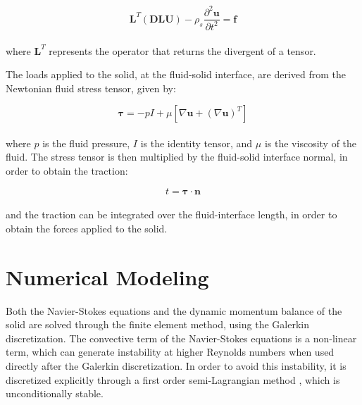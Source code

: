\documentclass{article}
\begin{document}
\begin{equation}
	\mathbf{L}^T ( \mathbf{D} \mathbf{L} \mathbf{U} ) - \rho_s \frac{\partial ^2 \mathbf{u} }{\partial t ^2 } = \mathbf{f}
	\label{eq:matrix form solid}
\end{equation} \\

\noindent where $\mathbf{L}^T$ represents the operator that returns the divergent of a tensor.
%
%

The loads applied to the solid, at the fluid-solid interface, are derived from the Newtonian fluid stress tensor, given by:

\begin{equation}
    \mathbf {\tau} = -pI + \mu [ \nabla \mathbf{u} + (\nabla \mathbf{u})^T ]
\end{equation} \\

\noindent where $p$ is the fluid pressure, $I$ is the identity tensor, and $\mu$ is the viscosity of the fluid. The stress tensor is then multiplied by the fluid-solid interface normal, in order to obtain the traction:

\begin{equation}
    t = \mathbf{\tau} \cdot \mathbf{n}
\end{equation} \\

\noindent and the traction can be integrated over the fluid-interface length, in order to obtain the forces applied to the solid.

\section{Numerical Modeling}

Both the Navier-Stokes equations and the dynamic momentum balance of the solid are solved through the finite element method, using the Galerkin discretization. The convective term of the Navier-Stokes equations is a non-linear term, which can generate instability at higher Reynolds numbers when used directly after the Galerkin discretization. In order to avoid this instability, it is discretized explicitly through a first order semi-Lagrangian method \cite{anjos_one_2022}, which is unconditionally stable.
\end{document}

